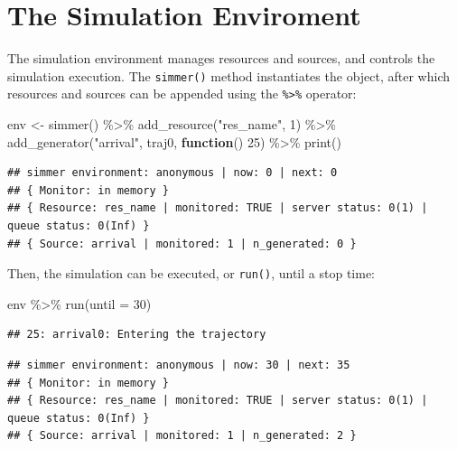 \documentclass[
]{book}
\newenvironment{Shaded}{\begin{snugshade}}{\end{snugshade}}
\newcommand{\AttributeTok}[1]{\textcolor[rgb]{0.77,0.63,0.00}{#1}}
\newcommand{\ControlFlowTok}[1]{\textcolor[rgb]{0.13,0.29,0.53}{\textbf{#1}}}
\newcommand{\DecValTok}[1]{\textcolor[rgb]{0.00,0.00,0.81}{#1}}
\newcommand{\FunctionTok}[1]{\textcolor[rgb]{0.00,0.00,0.00}{#1}}
\newcommand{\NormalTok}[1]{#1}
\newcommand{\OtherTok}[1]{\textcolor[rgb]{0.56,0.35,0.01}{#1}}
\newcommand{\SpecialCharTok}[1]{\textcolor[rgb]{0.00,0.00,0.00}{#1}}
\newcommand{\StringTok}[1]{\textcolor[rgb]{0.31,0.60,0.02}{#1}}
\theoremstyle{definition}
\theoremstyle{definition}
\theoremstyle{definition}
\theoremstyle{definition}
\theoremstyle{remark}
\begin{document}
\hypertarget{the-simulation-enviroment}{%
\section{The Simulation Enviroment}\label{the-simulation-enviroment}}

The simulation environment manages resources and sources, and controls the simulation execution. The \texttt{simmer()} method instantiates the object, after which resources and sources can be appended using the \texttt{\%\textgreater{}\%} operator:

\begin{Shaded}
\begin{Highlighting}[]
\NormalTok{env }\OtherTok{\textless{}{-}} \FunctionTok{simmer}\NormalTok{() }\SpecialCharTok{\%\textgreater{}\%} 
  \FunctionTok{add\_resource}\NormalTok{(}\StringTok{"res\_name"}\NormalTok{, }\DecValTok{1}\NormalTok{) }\SpecialCharTok{\%\textgreater{}\%}
  \FunctionTok{add\_generator}\NormalTok{(}\StringTok{"arrival"}\NormalTok{, traj0, }\ControlFlowTok{function}\NormalTok{() }\DecValTok{25}\NormalTok{) }\SpecialCharTok{\%\textgreater{}\%}
  \FunctionTok{print}\NormalTok{()}
\end{Highlighting}
\end{Shaded}

\begin{verbatim}
## simmer environment: anonymous | now: 0 | next: 0
## { Monitor: in memory }
## { Resource: res_name | monitored: TRUE | server status: 0(1) | queue status: 0(Inf) }
## { Source: arrival | monitored: 1 | n_generated: 0 }
\end{verbatim}

Then, the simulation can be executed, or \texttt{run()}, until a stop time:

\begin{Shaded}
\begin{Highlighting}[]
\NormalTok{env }\SpecialCharTok{\%\textgreater{}\%} \FunctionTok{run}\NormalTok{(}\AttributeTok{until =} \DecValTok{30}\NormalTok{)}
\end{Highlighting}
\end{Shaded}

\begin{verbatim}
## 25: arrival0: Entering the trajectory
\end{verbatim}

\begin{verbatim}
## simmer environment: anonymous | now: 30 | next: 35
## { Monitor: in memory }
## { Resource: res_name | monitored: TRUE | server status: 0(1) | queue status: 0(Inf) }
## { Source: arrival | monitored: 1 | n_generated: 2 }
\end{verbatim}
\end{document}
